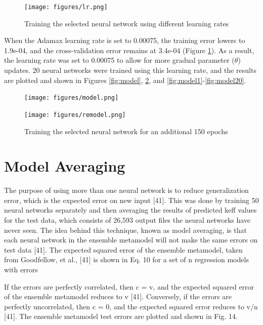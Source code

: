 \begin{figure}
  \centering
  \texttt{[image: figures/lr.png]}
  \caption{Training the selected neural network using different learning rates}
  \label{fig:lr}
\end{figure}

When the Adamax learning rate is set to 0.00075, the training error lowers to 1.9e-04, and the cross-validation error remains at 3.4e-04 (Figure \ref{fig:lr}).
As a result, the learning rate was set to 0.00075 to allow for more gradual parameter ($\theta$) updates.
20 neural networks were trained using this learning rate, and the results are plotted and shown in Figures \ref{fig:model}, \ref{fig:remodel}, and \ref{fig:model1}-\ref{fig:model20}.
%
\begin{figure}
  \centering
  \texttt{[image: figures/model.png]}
  \caption{Training the selected neural network for 1,500 epochs}
  \label{fig:model}
  \vspace{+1.1cm}
  \texttt{[image: figures/remodel.png]}
  \caption{Training the selected neural network for an additional 150 epochs}
  \label{fig:remodel}
\end{figure}

\section{Model Averaging}

The purpose of using more than one neural network is to reduce generalization error, which is the expected error on new input [41].
This was done by training 50 neural networks separately and then averaging the results of predicted keff values for the test data, which consists of 26,593 output files the neural networks have never seen.
The idea behind this technique, known as model averaging, is that each neural network in the ensemble metamodel will not make the same errors on test data [41].
The expected squared error of the ensemble metamodel, taken from Goodfellow, et al., [41] is shown in Eq. 10 for a set of n regression models with errors %

If the errors are perfectly correlated, then c = v, and the expected squared error of the ensemble metamodel reduces to v [41].
Conversely, if the errors are perfectly uncorrelated, then c = 0, and the expected squared error reduces to v/n [41].
The ensemble metamodel test errors are plotted and shown in Fig. 14.
